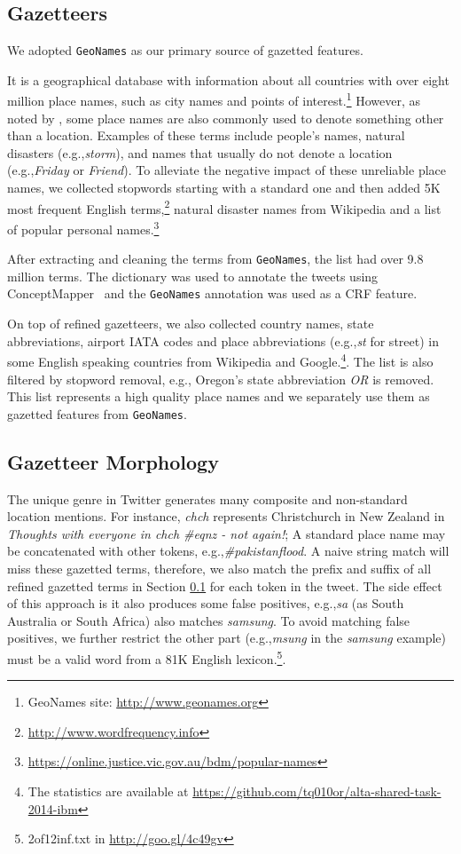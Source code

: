 \documentclass[11pt]{article}
\newcommand{\eg}{e.g.,\xspace}
\newcommand{\geoname}{\texttt{GeoNames}\xspace}
\newcommand{\myex}[1]{\textit{#1}}
\newcommand{\myurl}[1]{{\footnotesize\url{#1}}}
\newcommand{\secref}[2][]{Section#1 \ref{#2}}
\begin{document}
\subsection{Gazetteers}
\label{sec:gaze_feature}

We adopted \geoname as our primary source of gazetted features.

It is a geographical database with information about all countries with over eight million place names, such as city names and points of interest.\footnote{GeoNames site: \myurl{http://www.geonames.org}} 
However, as noted by , some place names are also commonly used to denote something other than a location.
Examples of these terms include people's names, natural disasters (\eg \myex{storm}), and names that usually do not denote a location (\eg \myex{Friday} or \myex{Friend}).
To alleviate the negative impact of these unreliable place names, we collected stopwords starting with a standard one and then added 5K most frequent English terms,\footnote{\myurl{http://www.wordfrequency.info}} natural disaster names from Wikipedia and a list of popular personal names.\footnote{\myurl{https://online.justice.vic.gov.au/bdm/popular-names}}

After extracting and cleaning the terms from \geoname, the list had over 9.8 million terms.
The dictionary was used to annotate the tweets using ConceptMapper~\cite{tanenblatt2010conceptmapper} and the \geoname annotation was used as a CRF feature.

On top of refined gazetteers, we also collected country names, state abbreviations, airport IATA codes and place abbreviations (\eg \myex{st} for street) in some English speaking countries from Wikipedia and Google.\footnote{The statistics are available at \myurl{https://github.com/tq010or/alta-shared-task-2014-ibm}}.
The list is also filtered by stopword removal, \eg Oregon's state abbreviation \myex{OR} is removed.
This list represents a high quality place names and we separately use them as gazetted features from \geoname.

\subsection{Gazetteer Morphology}
\label{sec:mor_feature}

The unique genre in Twitter generates many composite and non-standard location mentions.
For instance, \myex{chch} represents Christchurch in New Zealand in \myex{Thoughts with everyone in chch \#eqnz - not again!}; 
A standard place name may be concatenated with other tokens, \eg \myex{\#pakistanflood}.
A naive string match will miss these gazetted terms, therefore, we also match the prefix and suffix of all refined gazetted terms in \secref{sec:gaze_feature} for each token in the tweet.
The side effect of this approach is it also produces some false positives, \eg \myex{sa} (as South Australia or South Africa) also matches \myex{samsung}.
To avoid matching false positives, we further restrict the other part (\eg \myex{msung} in the \myex{samsung} example) must be a valid word from a 81K English lexicon.\footnote{2of12inf.txt in \myurl{http://goo.gl/4c49gv}}.
\end{document}
